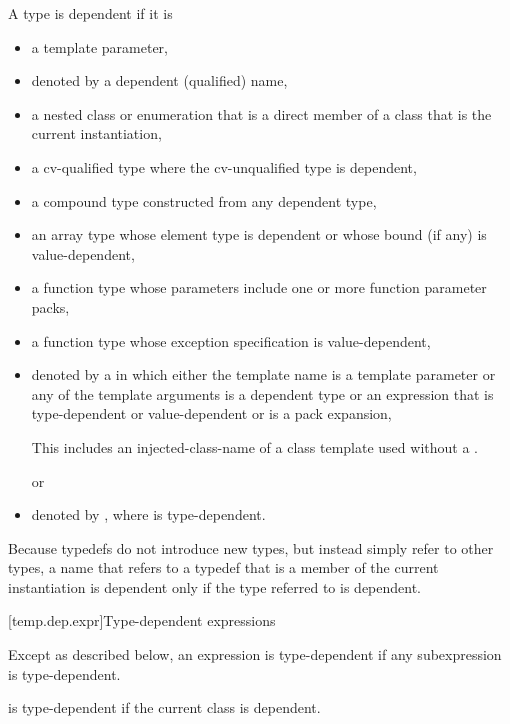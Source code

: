 \pnum
A type is dependent if it is
\begin{itemize}
\item
a template parameter,
\item
denoted by a dependent (qualified) name,
\item
a nested class or enumeration that is a direct member of
a class that is the current instantiation,
\item
a cv-qualified type where the cv-unqualified type is dependent,
\item
a compound type constructed from any dependent type,
\item
an array type whose element type is dependent or whose
bound (if any) is value-dependent,
\item
a function type whose parameters include one or more function parameter packs,
\item
a function type whose exception specification is value-dependent,
\item
denoted by a 
in which either the template name is a template parameter or any of the
template arguments is a dependent type or an expression that is type-dependent
or value-dependent or is a pack expansion,
\begin{footnote}
This includes an injected-class-name of a class template
used without a .
\end{footnote}
or
\item denoted by \tcode{)},
where  is type-dependent.
\end{itemize}

\pnum
\begin{note}
Because typedefs do not introduce new types, but
instead simply refer to other types, a name that refers to a
typedef that is a member of the current instantiation is dependent
only if the type referred to is dependent.
\end{note}

[temp.dep.expr]{Type-dependent expressions}

\pnum
Except as described below, an expression is type-dependent if any
subexpression is type-dependent.

\pnum
{}
is type-dependent if the current class is
dependent.

